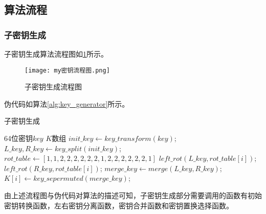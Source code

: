 \documentclass[a4paper, zihao=-4, UTF-8]{ctexart}
\begin{document}
        \subsection{算法流程}
            \subsubsection{子密钥生成}
                子密钥生成算法流程图如\cref{fig:key_gen_flow}所示。
                \begin{figure}[htbp]
                    \centering
                    \texttt{[image: my密钥流程图.png]}
                    \caption{子密钥生成流程图}
                    \label{fig:key_gen_flow}
                \end{figure}
                伪代码如算法\ref{alg:key_generator}所示。
                \begin{algorithm}[htbp]
                    \caption{子密钥生成}
                    \label{alg:key_generator}
                    \begin{algorithmic}[1]
                        \Require 64位密钥$key$
                        \Ensure $K$数组
							\State $init\_key\gets key\_transform(key)$;
							\State $L\_key,R\_key\gets key\_split(init\_key)$;
							\State $rot\_table\gets [1, 1, 2, 2, 2, 2, 2, 2, 1, 2, 2, 2, 2, 2, 2, 1]$
								\State $left\_rot(L\_key,rot\_table[i])$;
								\State $left\_rot(R\_key,rot\_table[i])$;
								\State $merge\_key \gets merge(L\_key, R\_key)$;
								\State $K[i]\gets key\_sepermuted(merge\_key)$;
							\EndFor
							\State {}
                        \EndFunction
                    \end{algorithmic}
                \end{algorithm}
                \par 由上述流程图与伪代码对算法的描述可知，子密钥生成部分需要调用的函数有初始密钥转换函数，左右密钥分离函数，密钥合并函数和密钥置换选择函数。
\end{document}

